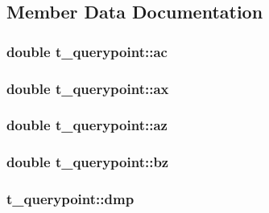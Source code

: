 \subsection{\-Member \-Data \-Documentation}
\hypertarget{structt__querypoint_a9bdfc6ab1c34ebea15ae610e78f03500}{
\subsubsection[{ac}]{\setlength{\rightskip}{0pt plus 5cm}double {\bf t\-\_\-querypoint\-::ac}}}\label{structt__querypoint_a9bdfc6ab1c34ebea15ae610e78f03500}
\hypertarget{structt__querypoint_a3d81596351adec6c28868e295b7de692}{
\subsubsection[{ax}]{\setlength{\rightskip}{0pt plus 5cm}double {\bf t\-\_\-querypoint\-::ax}}}\label{structt__querypoint_a3d81596351adec6c28868e295b7de692}
\hypertarget{structt__querypoint_a802060bc71cf6bf41cdcfc05885fecf2}{
\subsubsection[{az}]{\setlength{\rightskip}{0pt plus 5cm}double {\bf t\-\_\-querypoint\-::az}}}\label{structt__querypoint_a802060bc71cf6bf41cdcfc05885fecf2}
\hypertarget{structt__querypoint_a288e26a9d76cda6da4349eade6979b86}{
\subsubsection[{bz}]{\setlength{\rightskip}{0pt plus 5cm}double {\bf t\-\_\-querypoint\-::bz}}}\label{structt__querypoint_a288e26a9d76cda6da4349eade6979b86}
\hypertarget{structt__querypoint_a9a6ae23aab5b144e0d45d5b5853de879}{
\subsubsection[{dmp}]{ {\bf t\-\_\-querypoint\-::dmp}}}\label{structt__querypoint_a9a6ae23aab5b144e0d45d5b5853de879}
